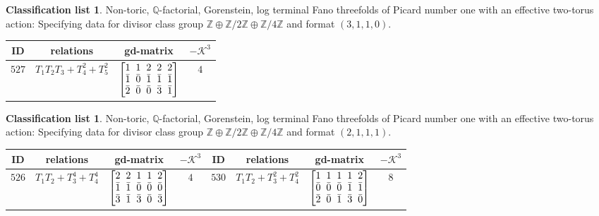 \documentclass[10pt,a4paper]{amsart}
\theoremstyle{definition}
\newtheorem{class-list}[thm]{Classification list}
\def\ZZ{{\mathbb Z}}
\def\QQ{{\mathbb Q}}
\numberwithin{equation}{section}
\begin{document}
\begin{class-list}
Non-toric, $\QQ$-factorial, Gorenstein, log terminal Fano
threefolds of Picard number one with an effective two-torus action:
Specifying data for divisor class group
$\ZZ\oplus \ZZ/2\ZZ\oplus \ZZ/4\ZZ$ and format $(3,1,1,0)$.
\begin{table}[h!]\centering\setlength{\tabcolsep}{5.5pt}
\renewcommand{\arraystretch}{1.1}\small\tabulinesep=1mm
\begin{tabu}{c|c|c|c}
\hline
ID&relations&gd-matrix&$-\mathcal{K}^3$
\\
\hline
${527}$&${T_{1}T_{2}T_{3}+T_{4}^{2}+T_{5}^{2}}$
&$\arraycolsep=1mm\begin{bmatrix}{1} & {1} & {2} & {2} & {2} \\ {\bar{1}} & {\bar{0}} & {\bar{1}} & {\bar{1}} & {\bar{1}} \\ {\bar{2}} & {\bar{0}} & {\bar{0}} & {\bar{3}} & {\bar{1}}\end{bmatrix}$
&${4}$
\\
\hline
\end{tabu}%
\end{table}
\end{class-list}


\begin{class-list}
Non-toric, $\QQ$-factorial, Gorenstein, log terminal Fano
threefolds of Picard number one with an effective two-torus action:
Specifying data for divisor class group
$\ZZ\oplus \ZZ/2\ZZ\oplus \ZZ/4\ZZ$ and format $(2,1,1,1)$.
\begin{table}[h!]\centering\setlength{\tabcolsep}{3.5pt}
\renewcommand{\arraystretch}{1.15}\small\tabulinesep=1mm
\begin{tabu}{c|c|c|c||c|c|c|c}
\hline
ID&relations&gd-matrix&$-\mathcal{K}^3$&ID&relations&gd-matrix&$-\mathcal{K}^3$
\\
\hline
${526}$&${T_{1}T_{2}+T_{3}^{4}+T_{4}^{4}}$
&$\arraycolsep=1mm\begin{bmatrix}{2} & {2} & {1} & {1} & {2} \\ {\bar{1}} & {\bar{1}} & {\bar{0}} & {\bar{0}} & {\bar{0}} \\ {\bar{3}} & {\bar{1}} & {\bar{3}} & {\bar{0}} & {\bar{3}}\end{bmatrix}$
&${4}$
&${530}$&${T_{1}T_{2}+T_{3}^{2}+T_{4}^{2}}$
&$\arraycolsep=1mm\begin{bmatrix}{1} & {1} & {1} & {1} & {2} \\ {\bar{0}} & {\bar{0}} & {\bar{0}} & {\bar{1}} & {\bar{1}} \\ {\bar{2}} & {\bar{0}} & {\bar{1}} & {\bar{3}} & {\bar{0}}\end{bmatrix}$
&${8}$
\\
\hline
\end{tabu}%
\end{table}
\end{class-list}
\end{document}
